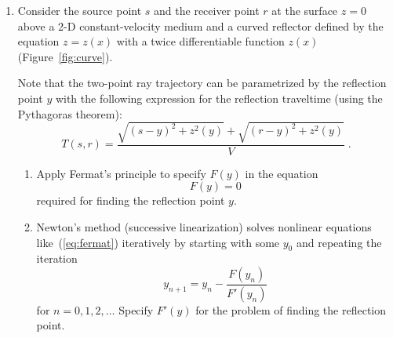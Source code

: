 \begin{enumerate}

\item Consider the source point $s$ and the receiver point $r$ at the
  surface $z=0$ above a 2-D constant-velocity medium and a curved
  reflector defined by the equation $z = z(x)$ with a twice
  differentiable function $z(x)$ (Figure~\ref{fig:curve}).


  Note that the two-point ray trajectory can be parametrized by the
  reflection point $y$ with the following expression for the
  reflection traveltime (using the Pythagoras theorem):
  \begin{equation}
      T(s,r) = {\frac{\sqrt{(s-y)^2+z^2(y)}+\sqrt{(r-y)^2+z^2(y)}}{V}}\;.
      \label{eq:dsr}
  \end{equation}

  \begin{enumerate}
  \item Apply Fermat's principle to specify $F(y)$ in the equation
    \begin{equation}
	\label{eq:fermat}
	    F(y) = 0
      \end{equation}
      required for finding the reflection point $y$.
      \item Newton's method (successive linearization) solves nonlinear
    equations like~(\ref{eq:fermat}) iteratively by starting with some
    $y_0$ and repeating the iteration
      \begin{equation}
      \label{eq:newton}
        y_{n+1} = y_n - \frac{F(y_n)}{F'(y_n)}
      \end{equation}
      for $n=0,1,2,\ldots$ Specify $F'(y)$ for the problem of finding the reflection point.


\end{enumerate}
\end{enumerate}
